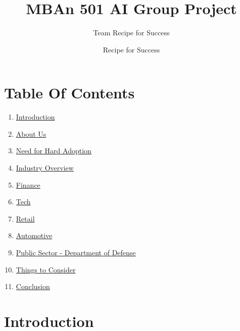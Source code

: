 \documentclass[
]{article}
\title{MBAn 501 AI Group Project}
\subtitle{Team Recipe for Success}
\author{Recipe for Success}
\date{}
\providecommand{\tightlist}{%
  \setlength{\itemsep}{0pt}\setlength{\parskip}{0pt}}
\begin{document}
\maketitle

{
\setcounter{tocdepth}{2}
\tableofcontents
}
\hypertarget{table-of-contents}{%
\section*{Table Of Contents}\label{table-of-contents}}

\begin{enumerate}
\def\labelenumi{\arabic{enumi}.}
\tightlist
\item
  \href{https://tmittala.github.io/Recipe_for_Success/introduction.html}{Introduction}
\item
  \href{https://tmittala.github.io/Recipe_for_Success/about-us.html}{About Us}
\item
  \href{https://tmittala.github.io/Recipe_for_Success/need-for-hard-adoption.html}{Need for Hard Adoption}
\item
  \href{https://tmittala.github.io/Recipe_for_Success/industry-overview.html}{Industry Overview}
\item
  \href{https://tmittala.github.io/Recipe_for_Success/finance.html}{Finance}
\item
  \href{https://tmittala.github.io/Recipe_for_Success/tech.html}{Tech}
\item
  \href{https://tmittala.github.io/Recipe_for_Success/retail.html}{Retail}
\item
  \href{https://tmittala.github.io/Recipe_for_Success/automotive.html}{Automotive}
\item
  \href{https://tmittala.github.io/Recipe_for_Success/public-sector---department-of-defense.html}{Public Sector - Department of Defense}
\item
  \href{https://tmittala.github.io/Recipe_for_Success/things-to-consider.html}{Things to Consider}
\item
  \href{https://tmittala.github.io/Recipe_for_Success/conclusion-1.html}{Conclusion}
\end{enumerate}

\hypertarget{introduction}{%
\section*{Introduction}\label{introduction}}
\end{document}
